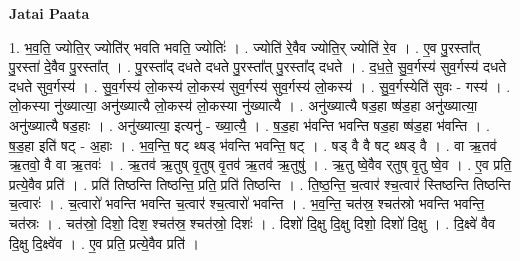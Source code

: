 \documentclass[17pt]{extarticle}
\begin{document}
\textbf{Jatai Paata} \newline

1. भ॒व॒ति॒ ज्योति॒र् ज्योति॑र् भवति भवति॒ ज्योतिः॑ । . ज्योति॑ रे॒वैव ज्योति॒र् ज्योति॑ रे॒व । . ए॒व पु॒रस्ता᳚त् पु॒रस्ता॑ दे॒वैव पु॒रस्ता᳚त् । . पु॒रस्ता᳚द् दधते दधते पु॒रस्ता᳚त् पु॒रस्ता᳚द् दधते । . द॒ध॒ते॒ सु॒व॒र्गस्य॑ सुव॒र्गस्य॑ दधते दधते सुव॒र्गस्य॑ । . सु॒व॒र्गस्य॑ लो॒कस्य॑ लो॒कस्य॑ सुव॒र्गस्य॑ सुव॒र्गस्य॑ लो॒कस्य॑ । . सु॒व॒र्गस्येति॑ सुवः - गस्य॑ । . लो॒कस्या नु॑ख्यात्या॒ अनु॑ख्यात्यै लो॒कस्य॑ लो॒कस्या नु॑ख्यात्यै । . अनु॑ख्यात्यै षड॒हा ष्ष॑ड॒हा अनु॑ख्यात्या॒ अनु॑ख्यात्यै षड॒हाः । . अनु॑ख्यात्या॒ इत्यनु॑ - ख्या॒त्यै॒ । . ष॒ड॒हा भ॑वन्ति भवन्ति षड॒हा ष्ष॑ड॒हा भ॑वन्ति । . ष॒ड॒हा इति॑ षट् - अ॒हाः । . भ॒व॒न्ति॒ षट् थ्षड् भ॑वन्ति भवन्ति॒ षट् । . षड् वै वै षट् थ्षड् वै । . वा ऋ॒तव॑ ऋ॒तवो॒ वै वा ऋ॒तवः॑ । . ऋ॒तव॑ ऋ॒तुष् वृ॒तुष् वृ॒तव॑ ऋ॒तव॑ ऋ॒तुषु॑ । . ऋ॒तु ष्वे॒वैव र्‌तुष् वृ॒तु ष्वे॒व । . ए॒व प्रति॒ प्रत्ये॒वैव प्रति॑ । . प्रति॑ तिष्ठन्ति तिष्ठन्ति॒ प्रति॒ प्रति॑ तिष्ठन्ति । . ति॒ष्ठ॒न्ति॒ च॒त्वार॑ श्च॒त्वार॑ स्तिष्ठन्ति तिष्ठन्ति च॒त्वारः॑ । . च॒त्वारो॑ भवन्ति भवन्ति च॒त्वार॑ श्च॒त्वारो॑ भवन्ति । . भ॒व॒न्ति॒ चत॑स्र॒ श्चत॑स्रो भवन्ति भवन्ति॒ चत॑स्रः । . चत॑स्रो॒ दिशो॒ दिश॒ श्चत॑स्र॒ श्चत॑स्रो॒ दिशः॑ । . दिशो॑ दि॒क्षु दि॒क्षु दिशो॒ दिशो॑ दि॒क्षु । . दि॒क्ष्वे॑ वैव दि॒क्षु दि॒क्ष्वे॑व । . ए॒व प्रति॒ प्रत्ये॒वैव प्रति॑ । \newline
\end{document}
